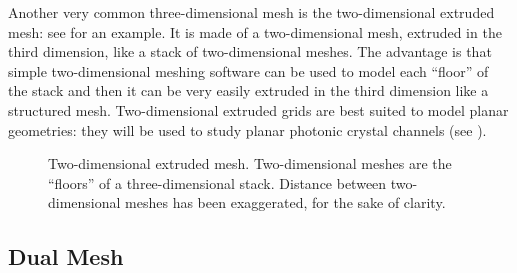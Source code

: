 Another very common three-dimensional mesh is the two-dimensional
extruded mesh: see  for an example. It is
made of a two-dimensional mesh, extruded in the third dimension, like
a stack of two-dimensional meshes. The advantage is that simple
two-dimensional meshing software \cite{meshing_software} can be used
to model each ``floor'' of the stack and then it can be very easily
extruded in the third dimension like a structured mesh. Two-dimensional
extruded grids are best suited to model planar geometries: they will
be used to study planar photonic crystal channels (see
).

\begin{figure}[htbp]
  \begin{center}
    \resizebox{5cm}{!}{}
  \end{center}
  \caption{Two-dimensional extruded mesh. Two-dimensional meshes are
    the ``floors'' of a three-dimensional stack. Distance between
    two-dimensional meshes has been exaggerated, for the sake of
    clarity.}    
  \label{fig:extruded_mesh}
\end{figure}


\subsection{Dual Mesh} \label{sec:dual_mesh}

